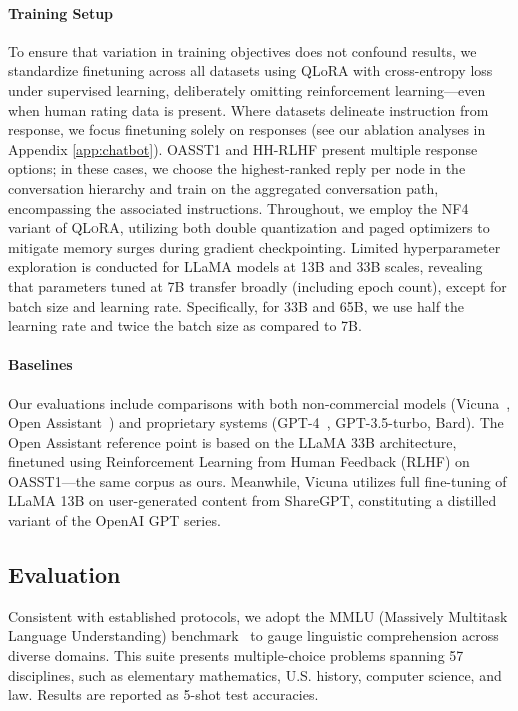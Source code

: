 \paragraph{Training Setup} To ensure that variation in training objectives does not confound results, we standardize finetuning across all datasets using QLoRA with cross-entropy loss under supervised learning, deliberately omitting reinforcement learning—even when human rating data is present. Where datasets delineate instruction from response, we focus finetuning solely on responses (see our ablation analyses in Appendix \ref{app:chatbot}). OASST1 and HH-RLHF present multiple response options; in these cases, we choose the highest-ranked reply per node in the conversation hierarchy and train on the aggregated conversation path, encompassing the associated instructions. Throughout, we employ the NF4 variant of \textsc{QLoRA}, utilizing both double quantization and paged optimizers to mitigate memory surges during gradient checkpointing. Limited hyperparameter exploration is conducted for LLaMA models at 13B and 33B scales, revealing that parameters tuned at 7B transfer broadly (including epoch count), except for batch size and learning rate. Specifically, for 33B and 65B, we use half the learning rate and twice the batch size as compared to 7B.

\paragraph{Baselines} Our evaluations include comparisons with both non-commercial models (Vicuna~\citep{vicuna2023}, Open Assistant~\citep{kopf2023openassistant}) and proprietary systems (GPT-4~\citep{openai2023gpt}, GPT-3.5-turbo, Bard). The Open Assistant reference point is based on the LLaMA 33B architecture, finetuned using Reinforcement Learning from Human Feedback (RLHF) on OASST1—the same corpus as ours. Meanwhile, Vicuna utilizes full fine-tuning of LLaMA 13B on user-generated content from ShareGPT, constituting a distilled variant of the OpenAI GPT series.

\subsection{Evaluation}

Consistent with established protocols, we adopt the MMLU (Massively Multitask Language Understanding) benchmark~\citep{hendrycksmeasuring} to gauge linguistic comprehension across diverse domains. This suite presents multiple-choice problems spanning 57 disciplines, such as elementary mathematics, U.S. history, computer science, and law. Results are reported as 5-shot test accuracies.

